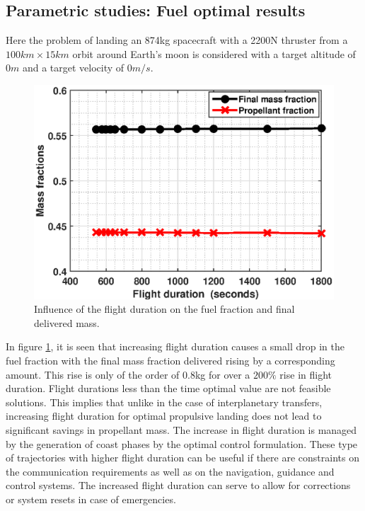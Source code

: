 \subsection{Parametric studies: Fuel optimal results}
Here the problem of landing an 874kg spacecraft with a 2200N thruster from a $100km\times 15km$ orbit around Earth's moon is considered with a target altitude of $0m$ and a target velocity of $0m/s$.
\begin{figure}[H]
	\centering\includegraphics[width=0.90\linewidth]{FuelOpt_massfracs.eps}
	\caption{Influence of the flight duration on the fuel fraction and final delivered mass.}
	\label{fig:parametric:4}
\end{figure}
In figure \ref{fig:parametric:4}, it is seen that increasing flight duration causes a small drop in the fuel fraction with the final mass fraction delivered rising by a corresponding amount. This rise is only of the order of 0.8kg for over a $200\%$ rise in flight duration. Flight durations less than the time optimal value are not feasible solutions. This implies that unlike in the case of interplanetary transfers, increasing flight duration for  optimal propulsive landing does not lead to significant savings in propellant mass. The increase in flight duration is managed by the generation of coast phases by the optimal control formulation. These type of trajectories with higher flight duration can be useful if there are constraints on the communication requirements as well as on the navigation, guidance and control systems. The increased flight duration can serve to allow for corrections or system resets in case of emergencies.
